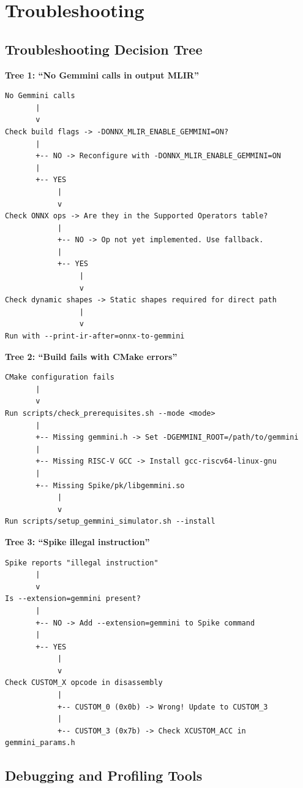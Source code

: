 \documentclass[12pt,a4paper]{article}
\begin{document}
\section{Troubleshooting}

\subsection{Troubleshooting Decision Tree}

\textbf{Tree 1: ``No Gemmini calls in output MLIR''}

\begin{verbatim}
No Gemmini calls
       |
       v
Check build flags -> -DONNX_MLIR_ENABLE_GEMMINI=ON?
       |
       +-- NO -> Reconfigure with -DONNX_MLIR_ENABLE_GEMMINI=ON
       |
       +-- YES
            |
            v
Check ONNX ops -> Are they in the Supported Operators table?
            |
            +-- NO -> Op not yet implemented. Use fallback.
            |
            +-- YES
                 |
                 v
Check dynamic shapes -> Static shapes required for direct path
                 |
                 v
Run with --print-ir-after=onnx-to-gemmini
\end{verbatim}

\textbf{Tree 2: ``Build fails with CMake errors''}

\begin{verbatim}
CMake configuration fails
       |
       v
Run scripts/check_prerequisites.sh --mode <mode>
       |
       +-- Missing gemmini.h -> Set -DGEMMINI_ROOT=/path/to/gemmini
       |
       +-- Missing RISC-V GCC -> Install gcc-riscv64-linux-gnu
       |
       +-- Missing Spike/pk/libgemmini.so
            |
            v
Run scripts/setup_gemmini_simulator.sh --install
\end{verbatim}

\textbf{Tree 3: ``Spike illegal instruction''}

\begin{verbatim}
Spike reports "illegal instruction"
       |
       v
Is --extension=gemmini present?
       |
       +-- NO -> Add --extension=gemmini to Spike command
       |
       +-- YES
            |
            v
Check CUSTOM_X opcode in disassembly
            |
            +-- CUSTOM_0 (0x0b) -> Wrong! Update to CUSTOM_3
            |
            +-- CUSTOM_3 (0x7b) -> Check XCUSTOM_ACC in gemmini_params.h
\end{verbatim}

\subsection{Debugging and Profiling Tools}
\end{document}
